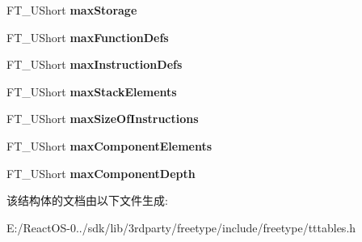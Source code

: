 \begin{DoxyCompactItemize}
\mbox{\label{struct_t_t___max_profile___a502a8579e3d358f3c00776ed0cc8a168}} 
F\+T\+\_\+\+U\+Short {\bfseries max\+Storage}
\item 
\mbox{\label{struct_t_t___max_profile___acc24e822a62bbfaa86d36f691fcde60b}} 
F\+T\+\_\+\+U\+Short {\bfseries max\+Function\+Defs}
\item 
\mbox{\label{struct_t_t___max_profile___a3f7bd433baede417293415cf60f20d8f}} 
F\+T\+\_\+\+U\+Short {\bfseries max\+Instruction\+Defs}
\item 
\mbox{\label{struct_t_t___max_profile___a2df9b9ff2a5a9daaa7c3d40fe024637f}} 
F\+T\+\_\+\+U\+Short {\bfseries max\+Stack\+Elements}
\item 
\mbox{\label{struct_t_t___max_profile___ac458411198b09d303ec8ae206e6926b6}} 
F\+T\+\_\+\+U\+Short {\bfseries max\+Size\+Of\+Instructions}
\item 
\mbox{\label{struct_t_t___max_profile___a110e6d735610c6d8fd89221d03440c32}} 
F\+T\+\_\+\+U\+Short {\bfseries max\+Component\+Elements}
\item 
\mbox{\label{struct_t_t___max_profile___a9ae1f117c954e0711b03f1675d6191d9}} 
F\+T\+\_\+\+U\+Short {\bfseries max\+Component\+Depth}
\end{DoxyCompactItemize}


该结构体的文档由以下文件生成\+:\begin{DoxyCompactItemize}
\item 
E\+:/\+React\+O\+S-\/0../sdk/lib/3rdparty/freetype/include/freetype/tttables.\+h\end{DoxyCompactItemize}
